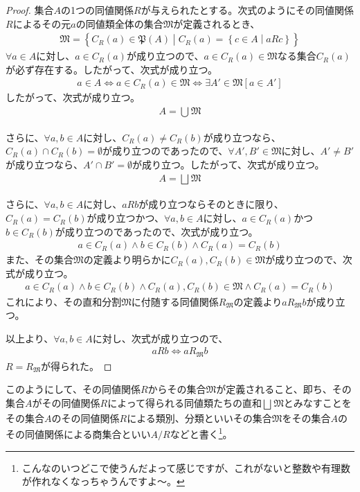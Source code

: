 \documentclass[dvipdfmx]{jsarticle}
\begin{document}
\begin{proof}
集合$A$の1つの同値関係$R$が与えられたとする。次式のようにその同値関係$R$によるその元$a$の同値類全体の集合$\mathfrak{M}$が定義されるとき、
\begin{align*}
\mathfrak{M} =\left\{ C_{R}(a)\in \mathfrak{P}(A) \middle| C_{R}(a) = \left\{ c \in A \middle| aRc \right\} \right\}
\end{align*}
$\forall a \in A$に対し、$a \in C_{R}(a)$が成り立つので、$a \in C_{R}(a)\in \mathfrak{M}$なる集合$C_{R}(a)$が必ず存在する。したがって、次式が成り立つ。
\begin{align*}
a \in A \Leftrightarrow a \in C_{R}(a)\in \mathfrak{M} \Leftrightarrow \exists A'\in \mathfrak{M}\left[ a \in A' \right]
\end{align*}
したがって、次式が成り立つ。
\begin{align*}
A = \bigcup_{} \mathfrak{M}
\end{align*}\par
さらに、$\forall a,b \in A$に対し、$C_{R}(a) \neq C_{R}(b)$が成り立つなら、$C_{R}(a) \cap C_{R}(b) = \emptyset$が成り立つのであったので、$\forall A',B'\in \mathfrak{M}$に対し、$A' \neq B'$が成り立つなら、$A' \cap B' = \emptyset$が成り立つ。したがって、次式が成り立つ。
\begin{align*}
A = \bigsqcup_{} \mathfrak{M}
\end{align*}\par
さらに、$\forall a,b \in A$に対し、$aRb$が成り立つならそのときに限り、$C_{R}(a) = C_{R}(b)$が成り立つかつ、$\forall a,b \in A$に対し、$a \in C_{R}(a)$かつ$b \in C_{R}(b)$が成り立つのであったので、次式が成り立つ。
\begin{align*}
a \in C_{R}(a) \land b \in C_{R}(b) \land C_{R}(a) = C_{R}(b)
\end{align*}
また、その集合$\mathfrak{M}$の定義より明らかに$C_{R}(a),C_{R}(b)\in \mathfrak{M}$が成り立つので、次式が成り立つ。
\begin{align*}
a \in C_{R}(a) \land b \in C_{R}(b) \land C_{R}(a),C_{R}(b)\in \mathfrak{M \land}C_{R}(a) = C_{R}(b)
\end{align*}
これにより、その直和分割$\mathfrak{M}$に付随する同値関係$R_{\mathfrak{M}}$の定義より$aR_{\mathfrak{M}}b$が成り立つ。\par
以上より、$\forall a,b \in A$に対し、次式が成り立つので、
\begin{align*}
aRb \Leftrightarrow aR_{\mathfrak{M}}b
\end{align*}
$R = R_{\mathfrak{M}}$が得られた。
\end{proof}
\begin{dfn}
このようにして、その同値関係$R$からその集合$\mathfrak{M}$が定義されること、即ち、その集合$A$がその同値関係$R$によって得られる同値類たちの直和$\bigsqcup_{} \mathfrak{M}$とみなすことをその集合$A$のその同値関係$R$による類別、分類といいその集合$\mathfrak{M}$をその集合$A$のその同値関係による商集合といい$A/R$などと書く\footnote{こんなのいつどこで使うんだよって感じですが、これがないと整数や有理数が作れなくなっちゃうんですよ～。}。
\end{dfn}
\end{document}
